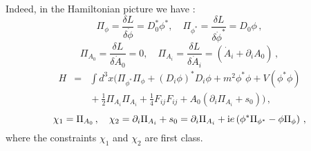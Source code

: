 \documentclass[12pt]{article}
\def\ii{\textrm i}
\begin{document}
Indeed, in the Hamiltonian picture we have \cite[pp.\ 113-127]{gitman90}:
\begin{equation}
\Pi_{\phi} = \frac{\delta L }{\delta {\dot \phi}  } = D^*_0 \phi^{*} , \quad \Pi_{\phi^*} = \frac{\delta L }{\delta {\dot \phi^*}  } = D_0 \phi \,, 
\label{sq.5}
\end{equation}
\begin{equation}
\Pi_{A_0} = \frac{\delta L }{\delta {\dot A_0} } = 0, \quad \Pi_{A_i} = \frac{\delta L }{\delta {\dot A_i} } = ({\dot A}_i +\partial_i A_0 )\,,
\label{sq.6}
\end{equation}
\begin{eqnarray}
H &=&   \int d^3 x \bigg(\Pi_{\phi^*} \Pi_{\phi} + \left(D_{i} \phi \right)^{*}  D_{i} \phi + m^2 \phi^*\phi + V(\phi^*\phi)\nonumber\\
&&  \mbox{} +  \frac{1}{2} \Pi_{A_i}\Pi_{A_i} + \frac{1}{4} F_{ij}F_{ij} + A_0\left( \partial_i \Pi_{A_i} + s_0 \right) \bigg)\,,
\label{sq.7}
\end{eqnarray}
\begin{equation}
\chi_{1} = \Pi_{A_0}\,, \quad \chi_{2} = \partial_i \Pi_{A_i} + s_0 =  \partial_i \Pi_{A_i} + \ii e\left(\phi^*  \Pi_{\phi^*} - \phi \Pi_{\phi} \right) \,,
\label{sq.8}
\end{equation}
where the constraints $\chi_1$ and $\chi_2$ are first class.
\end{document}
